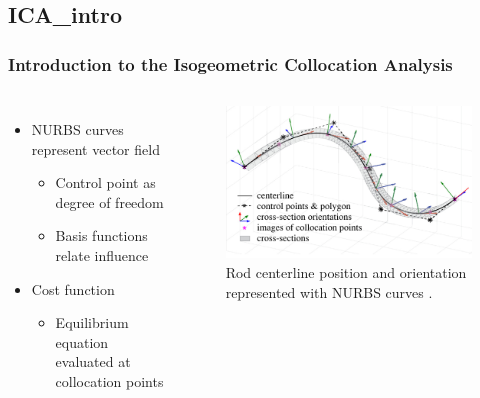 \documentclass[compress]{thesisbeamer}
\begin{document}
		\subsection{ICA_intro}
        \begin{frame}
        	\frametitle{Introduction to the Isogeometric Collocation Analysis}
			\begin{columns}
			\begin{itemize}%
  				\item NURBS curves represent vector field
  				\begin{itemize}
  					\item Control point as degree of freedom
  					\item Basis functions relate influence
  				\end{itemize}
  				\item Cost function
  				\begin{itemize}
  					\item Equilibrium equation evaluated at collocation points
  				\end{itemize}
 			\end{itemize}
			\begin{figure}[h]
				\centering
				\includegraphics[width=\textwidth]{images/ICA}
				\caption{Rod centerline position and orientation represented with NURBS curves \cite{piegl_nurbs_1997}.}
			\end{figure}
			\end{columns}
		\end{frame}
		
\end{document}
